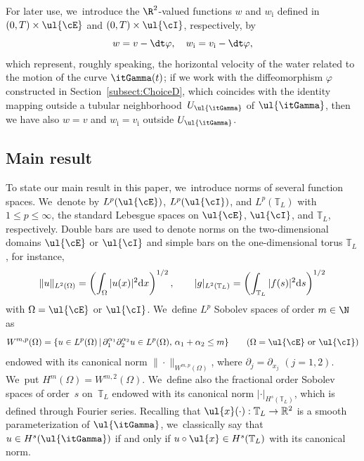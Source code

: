 For later use, we~introduce the $\R^2$-valued functions $w$ and $w_\mathrm{i}$ defined in $(0,T)\times\ul{\cE}$ and $(0,T)\times\ul{\cI}$, respectively, by
\begin{equation}\label{defw}
w=v-\dt\varphi, \quad w_\mathrm{i}=v_\mathrm{i}-\dt\varphi,
\end{equation}
which represent, roughly speaking, the horizontal velocity of the water related to the motion of the curve $\itGamma(t)$;
if we work with the diffeomorphism $\varphi$ constructed in Section~\ref{subsect:ChoiceD},
which coincides with the identity mapping outside a tubular neighborhood~$U_{\ul{\itGamma}}$ of $\ul{\itGamma}$,
then we have also $w=v$ and $w_\mathrm{i}=v_\mathrm{i}$ outside $U_{\ul{\itGamma}}$.

\subsection{Main result}\label{subsect:result}
To state our main result in this paper, we~introduce norms of several function spaces. We~denote by $L^p(\ul{\cE})$, $L^p(\ul{\cI})$, and $L^p(\mathbb{T}_L)$ with $1\leq p\leq \infty$,
the standard Lebesgue spaces on $\ul{\cE}$, $\ul{\cI}$, and $\mathbb{T}_L$, respectively.
Double bars are used to denote norms on the two-dimensional domains $\ul{\cE}$ or $\ul{\cI}$ and simple bars on the one-dimensional torus $\mathbb{T}_L$,
for instance,
\[
\|u\|_{L^2(\Omega)}=\left(\int_\Omega |u(x)|^2 {\rm d}x \right)^{1/2}, \qquad
|g|_{L^2(\mathbb{T}_L)}=\left(\int_{\mathbb{T}_L} |f(s)|^2 {\rm d}s \right)^{1/2}
\]
with $\Omega=\ul{\cE}$ or $\ul{\cI}$. We~define $L^p$ Sobolev spaces of order $m\in \N$ as
\[
W^{m,p}(\Omega)=\{ u\in L^p(\Omega) \,|\, \partial_1^{\alpha_1}\partial_2^{\alpha_2} u \in L^p(\Omega),\, \alpha_1+\alpha_2\leq m\}
\qquad (\Omega=\ul{\cE} \mbox{ or } \ul{\cI})
\]
endowed with its canonical norm $\|\cdot\|_{W^{m,p}(\Omega)}$, where $\partial_j=\partial_{x_j}$ $(j=1,2)$. We~put $H^m(\Omega)=W^{m,2}(\Omega)$. We~define also the fractional order Sobolev spaces of order~$s$ on~$\mathbb{T}_L$ endowed with its canonical norm $|\cdot|_{H^s(\mathbb{T}_L)}$,
which is defined through Fourier series.
Recalling that $\ul{x}(\cdot):{\mathbb T}_L\to {\mathbb R}^2$ is a smooth parameterization of $\ul{\itGamma}$, we~classically say that $u\in H^s(\ul{\itGamma})$ if and only if $u\circ\ul{x}\in H^s({\mathbb T}_L)$ with its canonical norm.

